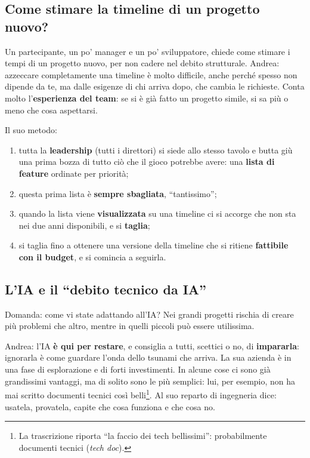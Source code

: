 \subsection{Come stimare la timeline di un progetto nuovo?}

Un partecipante, un po' manager e un po' sviluppatore, chiede come stimare i tempi
di un progetto nuovo, per non cadere nel debito strutturale. Andrea: azzeccare
completamente una timeline è molto difficile, anche perché spesso non dipende da
te, ma dalle esigenze di chi arriva dopo, che cambia le richieste. Conta molto
l'\textbf{esperienza del team}: se si è già fatto un progetto simile, si sa più o
meno che cosa aspettarsi.

Il suo metodo:
\begin{enumerate}
  \item tutta la \textbf{leadership} (tutti i direttori) si siede allo stesso
        tavolo e butta giù una prima bozza di tutto ciò che il gioco potrebbe
        avere: una \textbf{lista di feature} ordinate per priorità;
  \item questa prima lista è \textbf{sempre sbagliata}, ``tantissimo'';
  \item quando la lista viene \textbf{visualizzata} su una timeline ci si accorge
        che non sta nei due anni disponibili, e si \textbf{taglia};
  \item si taglia fino a ottenere una versione della timeline che si ritiene
        \textbf{fattibile con il budget}, e si comincia a seguirla.
\end{enumerate}

\subsection{L'IA e il ``debito tecnico da IA''}

Domanda: come vi state adattando all'IA? Nei grandi progetti rischia di creare più
problemi che altro, mentre in quelli piccoli può essere utilissima.

Andrea: l'IA \textbf{è qui per restare}, e consiglia a tutti, scettici o no, di
\textbf{impararla}: ignorarla è come guardare l'onda dello tsunami che arriva. La
sua azienda è in una fase di esplorazione e di forti investimenti. In alcune cose ci
sono già grandissimi vantaggi, ma di solito sono le più semplici: lui, per esempio,
non ha mai scritto documenti tecnici così belli\footnote{La trascrizione riporta
``la faccio dei tech bellissimi'': probabilmente documenti tecnici (\emph{tech
doc}).}. Al suo reparto di ingegneria dice: usatela, provatela, capite che cosa
funziona e che cosa no.

